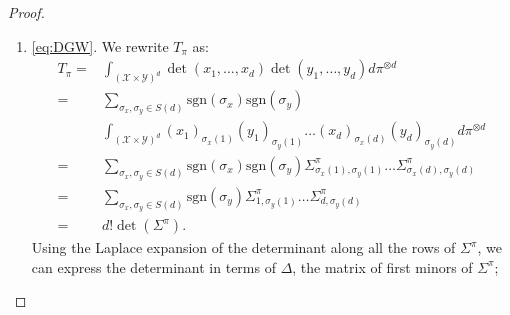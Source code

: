 \documentclass{article}
\newcommand{\Y}{\mathcal{Y}}
\newcommand{\X}{\mathcal{X}}
\newcommand{\1}{\mathbf{1}}
\newcommand{\sgn}{\mathrm{sgn}}
\theoremstyle{definition}
\theoremstyle{remark}
\begin{document}
\begin{appendices}
\begin{proof}
\begin{enumerate}
        
        \item \ref{eq:DGW}. We rewrite $T_\pi$ as: 
        \begin{equation*}
            \begin{split}
                T_{\pi}=&\int_{(\X\times\Y)^d}\det(x_1,\dots,x_d)\det(y_1,\dots,y_d)d\pi^{\otimes d}\\
                =&\sum_{\sigma_x,\sigma_y\in S(d)}\sgn(\sigma_x)\sgn(\sigma_y)\\ & \int_{(\X\times\Y)^d}(x_1)_{\sigma_x(1)}(y_1)_{\sigma_y(1)}\dots (x_d)_{\sigma_x(d)}(y_d)_{\sigma_y(d)}d\pi^{\otimes d}\\
                =&\sum_{\sigma_x,\sigma_y\in S(d)} \sgn(\sigma_x)\sgn(\sigma_y)\Sigma^\pi_{\sigma_x(1),\sigma_y(1)}\dots\Sigma^\pi_{\sigma_x(d),\sigma_y(d)}\\
                =&\sum_{\sigma_x,\sigma_y\in S(d)} \sgn(\sigma_y)\Sigma^\pi_{1,\sigma_y(1)}\dots\Sigma^\pi_{d,\sigma_y(d)}\\
                =&d! \det(\Sigma^\pi).
            \end{split}
        \end{equation*}
        Using the Laplace expansion of the determinant along all the rows of $\Sigma^\pi$, we can express the determinant in terms of $\Delta$, the matrix of first minors of $\Sigma^\pi$;
        

\end{enumerate}
\end{proof}
\end{appendices}
\end{document}
